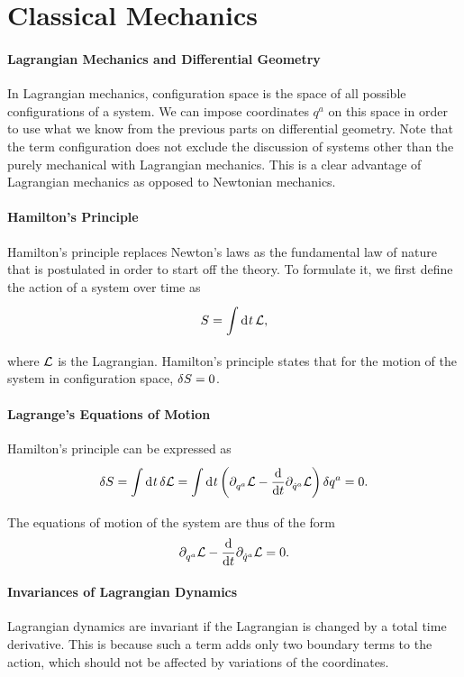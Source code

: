 \section{Classical Mechanics}

\paragraph{Lagrangian Mechanics and Differential Geometry}
In Lagrangian mechanics, configuration space is the space of all possible configurations of a system. We can impose coordinates $q^{a}$ on this space in order to use what we know from the previous parts on differential geometry. Note that the term configuration does not exclude the discussion of systems other than the purely mechanical with Lagrangian mechanics. This is a clear advantage of Lagrangian mechanics as opposed to Newtonian mechanics.

\paragraph{Hamilton's Principle}
Hamilton's principle replaces Newton's laws as the fundamental law of nature that is postulated in order to start off the theory. To formulate it, we first define the action of a system over time as
\begin{align*}
	S = \int\limits_{}^{}\dd[]{t}\mathcal{L},
\end{align*}
where $\mathcal{L}$ is the Lagrangian. Hamilton's principle states that for the motion of the system in configuration space, $\var{S} = 0$.

\paragraph{Lagrange's Equations of Motion}
Hamilton's principle can be expressed as
\begin{align*}
	\var{S} = \int\limits_{}^{}\dd[]{t}\var{\ensuremath{\mathcal{L}}} = \int\limits_{}^{}\dd[]{t}\left(\partial^{}_{q^{a}}\mathcal{L} - \dv{t}\partial^{}_{\dot{q}^{a}}\mathcal{L}\right)\var{q^{a}} = 0.
\end{align*}
The equations of motion of the system are thus of the form
\begin{align*}
	\partial^{}_{q^{a}}\mathcal{L} - \dv{t}\partial^{}_{\dot{q}^{a}}\mathcal{L} = 0.
\end{align*}

\paragraph{Invariances of Lagrangian Dynamics}
Lagrangian dynamics are invariant if the Lagrangian is changed by a total time derivative. This is because such a term adds only two boundary terms to the action, which should not be affected by variations of the coordinates.

